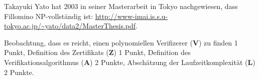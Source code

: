 \begin{diskussion}
Takayuki Yato hat 2003 in seiner Masterarbeit in Tokyo nachgewiesen,
dass Fillomino NP-vollständig ist:
\url{http://www-imai.is.s.u-tokyo.ac.jp/~yato/data2/MasterThesis.pdf}.
\end{diskussion}

\begin{bewertung}
Beobachtung, dass es reicht, einen polynomiellen Verifizerer ({\bf V})
zu finden 1 Punkt,
Definition des Zertifikats ({\bf Z}) 1 Punkt,
Definition des Verifikationsalgorithmus ({\bf A}) 2 Punkte,
Abschätzung der Laufzeitkomplexität ({\bf L}) 2 Punkte.
\end{bewertung}


